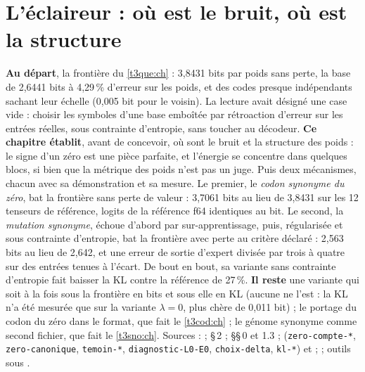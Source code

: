 \chapter{L'éclaireur : où est le bruit, où est la structure}\label{t3ecl:ch}

\begin{origine}
\textbf{Au départ}, la frontière du \cref{t3que:ch} : 3,8431 bits par poids sans perte, la base de 2,6441 bits à 4,29\,\% d'erreur sur les poids, et des codes presque indépendants sachant leur échelle (0,005 bit pour le voisin). La lecture avait désigné une case vide : choisir les symboles d'une base emboîtée par rétroaction d'erreur sur les entrées réelles, sous contrainte d'entropie, sans toucher au décodeur.
\textbf{Ce chapitre établit}, avant de concevoir, où sont le bruit et la structure des poids : le signe d'un zéro est une pièce parfaite, et l'énergie se concentre dans quelques blocs, si bien que la métrique des poids n'est pas un juge. Puis deux mécanismes, chacun avec sa démonstration et sa mesure. Le premier, le \emph{codon synonyme du zéro}, bat la frontière sans perte de valeur : 3,7061 bits au lieu de 3,8431 sur les 12 tenseurs de référence, logits de la référence f64 identiques au bit. Le second, la \emph{mutation synonyme}, échoue d'abord par sur-apprentissage, puis, régularisée et sous contrainte d'entropie, bat la frontière avec perte au critère déclaré : 2,563 bits au lieu de 2,642, et une erreur de sortie d'expert divisée par trois à quatre sur des entrées tenues à l'écart. De bout en bout, sa variante sans contrainte d'entropie fait baisser la KL contre la référence de 27\,\%.
\textbf{Il reste} une variante qui soit à la fois sous la frontière en bits et sous elle en KL (aucune ne l'est : la KL n'a été mesurée que sur la variante $\lambda = 0$, plus chère de 0,011 bit) ; le portage du codon du zéro dans le format, que fait le \cref{t3cod:ch} ; le génome synonyme comme second fichier, que fait le \cref{t3sno:ch}.
Sources :  ;  §\,2 ;  §§\,0 et 1.3 ;  (\texttt{zero-compte-*}, \texttt{zero-canonique}, \texttt{temoin-*}, \texttt{diagnostic-L0-E0}, \texttt{choix-delta}, \texttt{kl-*}) et  ;  ; outils sous .
\end{origine}

